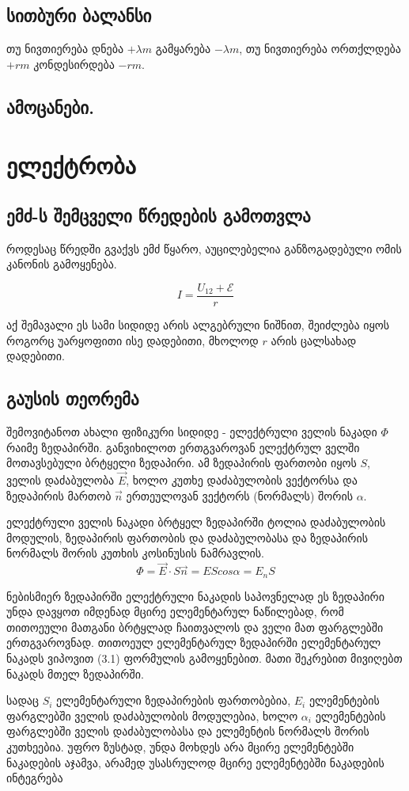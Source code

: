 \documentclass[a4paper]{book}
\begin{document}
\section{სითბური ბალანსი}
თუ ნივთიერება დნება $+\lambda m$ გამყარება $-\lambda m$, თუ ნივთიერება ორთქლდება $+r m$ კონდესირდება $-rm$.
\section{ამოცანები.}

\chapter{ელექტრობა}

\section{ემძ-ს შემცველი წრედების გამოთვლა}
როდესაც წრედში გვაქვს ემძ წყარო, აუცილებელია განზოგადებული ომის კანონის გამოყენება. 

$$I = \frac{U_{12} + \mathcal{E}}{r}$$

აქ შემავალი ეს სამი სიდიდე არის ალგებრული ნიშნით, შეიძლება იყოს როგორც უარყოფითი ისე დადებითი, მხოლოდ $r$ არის ცალსახად დადებითი.
\section{გაუსის თეორემა}
შემოვიტანოთ ახალი ფიზიკური სიდიდე - ელექტრული ველის ნაკადი $\Phi$ რაიმე ზედაპირში. განვიხილოთ ერთგვაროვან ელექტრულ ველში მოთავსებული ბრტყელი ზედაპირი. ამ ზედაპირის ფართობი იყოს $S$, ველის დაძაბულობა $\vec{E}$, ხოლო კუთხე დაძაბულობის ვექტორსა და ზედაპირის მართობ $\vec{n}$ ერთეულოვან ვექტორს (ნორმალს) შორის $\alpha$.

ელექტრული ველის ნაკადი ბრტყელ ზედაპირში ტოლია დაძაბულობის მოდულის, ზედაპირის ფართობის და დაძაბულობასა და ზედაპირის ნორმალს შორის კუთხის კოსინუსის ნამრავლის.
	$$\Phi = \vec{E}\cdot S\vec{n}=EScos\alpha=E_n S$$

ნებისმიერ ზედაპირში ელექტრული ნაკადის საპოვნელად ეს ზედაპირი უნდა დავყოთ იმდენად მცირე ელემენტარულ ნაწილებად, რომ თითოეული მათგანი ბრტყლად ჩაითვალოს და ველი მათ ფარგლებში ერთგვაროვნად. თითოეულ ელემენტარულ ზედაპირში ელემენტარულ ნაკადს ვიპოვით (3.1) ფორმულის გამოყენებით. მათი შეკრებით მივიღებთ ნაკადს მთელ ზედაპირში.

სადაც $S_i$ ელემენტარული ზედაპირების ფართობებია, $E_i$ ელემენტების ფარგლებში ველის დაძაბულობის მოდულებია, ხოლო $\alpha_i$ ელემენტების ფარგლებში ველის დაძაბულობასა და ელემენტის ნორმალს შორის კუთხეებია. უფრო ზუსტად, უნდა მოხდეს არა მცირე ელემენტებში ნაკადების აჯამვა, არამედ უსასრულოდ მცირე ელემენტებში ნაკადების ინტეგრება
\end{document}
